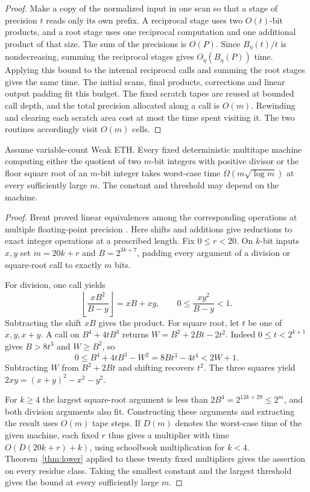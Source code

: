 \begin{proof}
Make a copy of the normalized input in one scan so that a stage
of precision $t$ reads only its own prefix. A reciprocal stage
uses two $O(t)$-bit products, and a root stage uses one reciprocal
computation and one additional product of that size. The sum of
the precisions is $O(P)$. Since $B_\eta(t)/t$ is nondecreasing,
summing the reciprocal stages gives $O_\eta(B_\eta(P))$ time.
Applying this bound to the internal reciprocal calls and summing
the root stages gives the same time. The initial scans, final
products, corrections and linear output padding fit this budget.
The fixed scratch tapes are reused at bounded call depth, and the
total precision allocated along a call is $O(m)$. Rewinding and
clearing each scratch area cost at most the time spent visiting
it. The two routines accordingly visit $O(m)$ cells.
\end{proof}

\begin{corollary}\label{cor:division-root-lower}
Assume variable-count Weak ETH. Every fixed deterministic multitape
machine computing either the quotient of two $m$-bit integers with
positive divisor or the floor square root of an $m$-bit integer takes
worst-case time $\Omega(m\sqrt{\log m})$ at every sufficiently large
$m$. The constant and threshold may depend on the machine.
\end{corollary}

\begin{proof}
Brent proved linear equivalences among the corresponding operations
at multiple floating-point precision \cite[Theorem~3.1]{BrentMultiplePrecision}.
Here shifts and additions give reductions to exact integer operations
at a prescribed length. Fix $0\le r<20$. On $k$-bit inputs $x,y$ set
$m=20k+r$ and $B=2^{3k+7}$, padding every argument of a division or
square-root call to exactly $m$ bits.

For division, one call yields
\[
 \left\lfloor\frac{xB^2}{B-y}\right\rfloor=xB+xy,
 \qquad 0\le\frac{xy^2}{B-y}<1 .
\]
Subtracting the shift $xB$ gives the product. For square root, let
$t$ be one of $x,y,x+y$. A call on $B^4+4tB^3$ returns
$W=B^2+2Bt-2t^2$. Indeed $0\le t<2^{k+1}$ gives $B>8t^3$ and
$W\ge B^2$, so
\[
 0\le B^4+4tB^3-W^2=8Bt^3-4t^4<2W+1 .
\]
Subtracting $W$ from $B^2+2Bt$ and shifting recovers $t^2$.
The three squares yield $2xy=(x+y)^2-x^2-y^2$.

For $k\ge4$ the largest square-root argument is less than
$2B^4=2^{12k+29}\le2^m$, and both division arguments also fit.
Constructing these arguments and extracting the result uses
$O(m)$ tape steps. If $D(m)$ denotes the worst-case time of the
given machine, each fixed $r$ thus gives a multiplier with time
$O(D(20k+r)+k)$, using schoolbook multiplication for $k<4$.
Theorem~\ref{thm:lower} applied to these twenty fixed multipliers
gives the assertion on every residue class. Taking the smallest
constant and the largest threshold gives the bound at every
sufficiently large $m$.
\end{proof}

